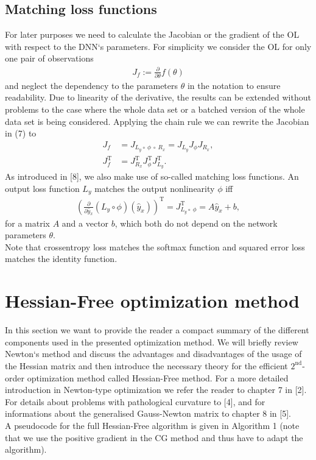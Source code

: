 \documentclass[conference]{IEEEtran}
\begin{document}
	\subsection{Matching loss functions}
	\noindent
	For later purposes we need to calculate the Jacobian or the gradient of the OL with respect to the DNN`s parameters. For simplicity we consider the OL for only one pair of observations
	\begin{align}
	J_{f} := \frac{\partial}{\partial\theta}f(\theta)
	\end{align}
	and neglect the dependency to the parameters $\theta$ in the notation to ensure readability.
	Due to linearity of the derivative, the results can be extended without problems to the case where the whole data set or a batched version of the whole data set is being considered.
	Applying the chain rule we can rewrite the Jacobian in (7) to
	\begin{align}
	J_{f} &= J_{L_{y}\circ \:\phi \:\circ\:R_{x}} = J_{L_{y}} J_{\phi} J_{R_{x}},\\
	J_{f}^{\mathrm{T}} &= J_{R_{x}}^{\mathrm{T}}  J_{\phi}^{\mathrm{T}}  J_{L_{y}}^{\mathrm{T}}.
	\end{align}
	As introduced in [8], we also make use of so-called matching loss functions. An output loss function $L_{y}$ matches the output nonlinearity $\phi$ iff
	\begin{align}
	\left(\frac{\partial}{\partial\hat{y}_{x}}\left(L_{y}\circ \phi\right)(\hat{y}_{x})\right)^{\mathrm{T}}= J_{L_{y}\circ \:\phi}^{\mathrm{T}} = A \hat{y}_{x} + b,
	\end{align}
	for a matrix $A$ and a vector $b$, which both do not depend on the network parameters $\theta$.\\
	Note that crossentropy loss matches the softmax function and squared error loss matches the identity function.


	\section{Hessian-Free optimization method}
	\noindent
	In this section we want to provide the reader a compact summary of the different components used in the presented optimization method. We will briefly review Newton`s method and discuss the advantages and disadvantages of the usage of the Hessian matrix and then introduce the necessary theory for the efficient $2^{\text{nd}}$-order optimization method called Hessian-Free method. For a more detailed introduction in Newton-type optimization we refer the reader to chapter 7 in [2]. For details about problems with pathological curvature to [4], and for informations about the generalised Gauss-Newton matrix to chapter 8 in [5].\\
	A pseudocode for the full Hessian-Free algorithm is given in Algorithm 1 (note that we use the positive gradient in the CG method and thus have to adapt the algorithm).
\end{document}
